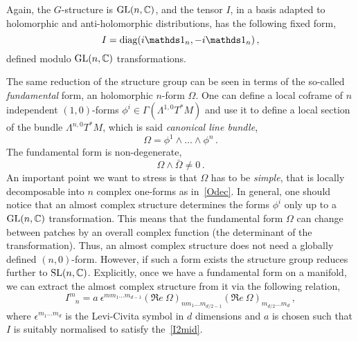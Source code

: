 \documentclass[debug]{phd}
\begin{document}
						Again, the $G$-structure is $\mathrm{GL}(n, \mathbb{C})$, and the tensor $I$, in a basis adapted to holomorphic and anti-holomorphic distributions, has the following fixed form,
								\begin{equation}
									I = \diag( i \id_n , -i \id_n )\, ,
								\end{equation}
						defined modulo $\mathrm{GL}(n, \mathbb{C})$ transformations.
		
						The same reduction of the structure group can be seen in terms of the so-called \emph{fundamental} form, an holomorphic $n$-form $\Omega$.
						One can define a local coframe of $n$ independent $(1,0)$-forms $\phi^i \in \Gamma(\Lambda^{1,0} T^*M)$ and use it to define a local section of the bundle $\Lambda^{n,0} T^*M$, which is said \emph{canonical line bundle},
								\begin{equation}\label{Odec}
									\Omega = \phi^1 \wedge \ldots \wedge \phi^n\, .
								\end{equation}
						The fundamental form is non-degenerate,
								\begin{equation}
									\Omega \wedge \bar{\Omega} \neq 0\, .
								\end{equation}
						An important point we want to stress is that $\Omega$ has to be \emph{simple}, that is locally decomposable into $n$ complex one-forms as in~\eqref{Odec}.
						In general, one should notice that an almost complex structure determines the forms $\phi^i$ only up to a $\mathrm{GL}(n,\mathbb{C})$ transformation. 
						This means that the fundamental form $\Omega$ can change between patches by an overall complex function (the determinant of the transformation).
						Thus, an almost complex structure does not need a globally defined $(n,0)$-form.
						However, if such a form exists the structure group reduces further to $\mathrm{SL}(n, \mathbb{C})$.
						Explicitly, once we have a fundamental form on a manifold, we can extract the almost complex structure from it via the following relation,
								\begin{equation}
									I^m_{\phantom{m}n} = a\ \epsilon^{mm_1 \ldots m_{d-1}} (\mathfrak{R}e\ \Omega)_{n m_1 \ldots m_{d/2 - 1}} (\mathfrak{R}e\ \Omega)_{m_{d/2} \ldots m_d}\, ,
								\end{equation}
						where $\epsilon^{m_1 \ldots m_d}$ is the Levi-Civita symbol in $d$ dimensions and $a$ is chosen such that $I$ is suitably normalised to satisfy the~\eqref{I2mid}.
\end{document}
